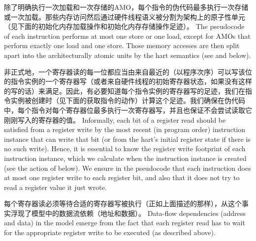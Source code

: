 除了明确执行一次加载和一次存储的AMO，每个指令的伪代码最多执行一次存储或一次加载。那些内存访问然后通过硬件线程语义被分割为架构上的原子性单元（见下面的初始化内存加载操作和初始化内存存储操作足迹）。
The pseudocode of each instruction performs at most one store or one load, except for AMOs that perform exactly one load and one store.
Those memory accesses are then split apart into the architecturally atomic units by the hart semantics (see  and  below).

非正式地，一个寄存器读的每一位都应当由来自最近的（以程序次序）可以写该位的指令实例的一个寄存器写（或者来自硬件线程的初始寄存器状态，如果没有这样的写的话）来满足。因此，有必要知道每个指令实例的寄存器写的足迹，我们在指令实例被创建时（见下面的获取指令的动作）计算这个足迹。我们确保在伪代码中，每个指令对每个寄存器位最多执行一次寄存器写，并且也保证不会尝试读取它刚刚写入的寄存器的值。
Informally, each bit of a register read should be satisfied from a register write by the most recent (in program order) instruction instance that can write that bit (or from the hart's initial register state if there is no such write).
Hence, it is essential to know the register write footprint of each instruction instance, which we calculate when the instruction instance is created (see the action of  below).
We ensure in the pseudocode that each instruction does at most one register write to each register bit, and also that it does not try to read a register value it just wrote.

每个寄存器读必须等待合适的寄存器写被执行（正如上面描述的那样），从这个事实浮现了模型中的数据流依赖（地址和数据）。
Data-flow dependencies (address and data) in the model emerge from the
fact that each register read has to wait for the appropriate register write to be executed (as described above).

